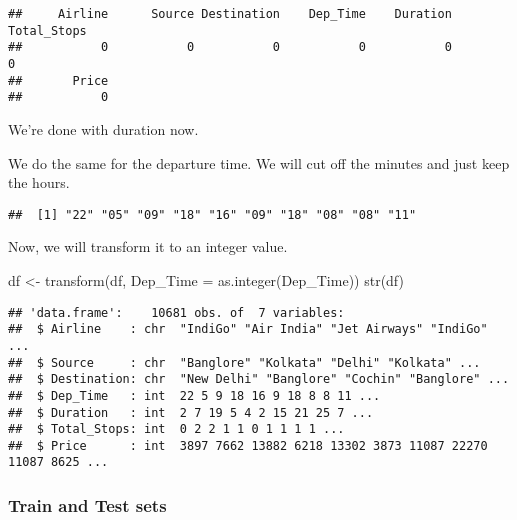 \documentclass[
]{article}
\newenvironment{Shaded}{\begin{snugshade}}{\end{snugshade}}
\newcommand{\AttributeTok}[1]{\textcolor[rgb]{0.77,0.63,0.00}{#1}}
\newcommand{\DecValTok}[1]{\textcolor[rgb]{0.00,0.00,0.81}{#1}}
\newcommand{\FunctionTok}[1]{\textcolor[rgb]{0.00,0.00,0.00}{#1}}
\newcommand{\NormalTok}[1]{#1}
\newcommand{\OtherTok}[1]{\textcolor[rgb]{0.56,0.35,0.01}{#1}}
\newcommand{\SpecialCharTok}[1]{\textcolor[rgb]{0.00,0.00,0.00}{#1}}
\newcommand{\StringTok}[1]{\textcolor[rgb]{0.31,0.60,0.02}{#1}}
\begin{document}
\begin{verbatim}
##     Airline      Source Destination    Dep_Time    Duration Total_Stops 
##           0           0           0           0           0           0 
##       Price 
##           0
\end{verbatim}

We're done with duration now.

We do the same for the departure time. We will cut off the minutes and
just keep the hours.

\begin{Shaded}
\end{Shaded}

\begin{verbatim}
##  [1] "22" "05" "09" "18" "16" "09" "18" "08" "08" "11"
\end{verbatim}

Now, we will transform it to an integer value.

\begin{Shaded}
\begin{Highlighting}[]
\NormalTok{df }\OtherTok{\textless{}{-}} \FunctionTok{transform}\NormalTok{(df, }\AttributeTok{Dep\_Time =} \FunctionTok{as.integer}\NormalTok{(Dep\_Time))}
\FunctionTok{str}\NormalTok{(df)}
\end{Highlighting}
\end{Shaded}

\begin{verbatim}
## 'data.frame':    10681 obs. of  7 variables:
##  $ Airline    : chr  "IndiGo" "Air India" "Jet Airways" "IndiGo" ...
##  $ Source     : chr  "Banglore" "Kolkata" "Delhi" "Kolkata" ...
##  $ Destination: chr  "New Delhi" "Banglore" "Cochin" "Banglore" ...
##  $ Dep_Time   : int  22 5 9 18 16 9 18 8 8 11 ...
##  $ Duration   : int  2 7 19 5 4 2 15 21 25 7 ...
##  $ Total_Stops: int  0 2 2 1 1 0 1 1 1 1 ...
##  $ Price      : int  3897 7662 13882 6218 13302 3873 11087 22270 11087 8625 ...
\end{verbatim}

\hypertarget{train-and-test-sets}{%
\subsubsection{Train and Test sets}\label{train-and-test-sets}}
\end{document}
